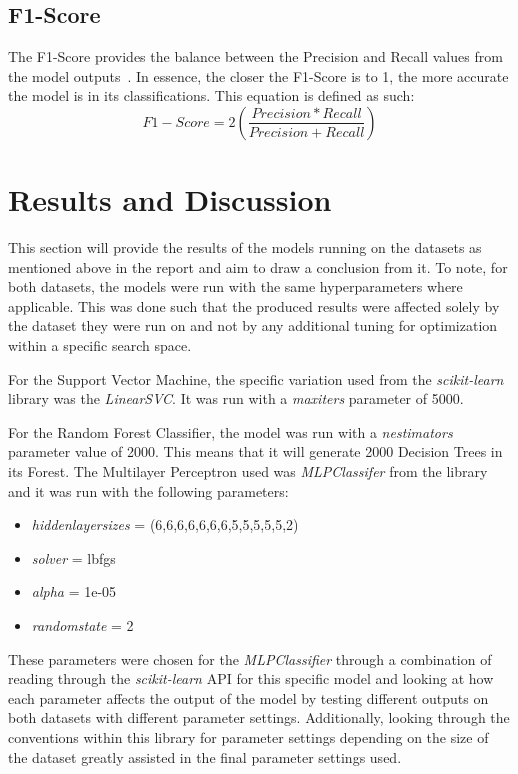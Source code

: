 \documentclass[11pt, a4paper]{article}
\begin{document}
\subsection{F1-Score}
The F1-Score provides the balance between the Precision and Recall values from the model outputs~\cite{f1}. In essence, the closer the F1-Score is to 1, the more accurate the model is in its classifications. This equation is defined as such:\\
\begin{equation}
F1-Score = 2 \left(\frac{Precision * Recall}{Precision + Recall}\right)
\end{equation}

\section{Results and Discussion}

This section will provide the results of the models running on the datasets as mentioned above in the report and aim to draw a conclusion from it. To note, for both datasets, the models were run with the same hyperparameters where applicable. This was done such that the produced results were affected solely by the dataset they were run on and not by any additional tuning for optimization within a specific search space. 

For the Support Vector Machine, the specific variation used from the \emph{scikit-learn} library was the \emph{LinearSVC}. It was run with a \emph{max\textunderscore iters} parameter of 5000. 

For the Random Forest Classifier, the model was run with a \emph{n\textunderscore estimators} parameter value of 2000. This means that it will generate 2000 Decision Trees in its Forest.
\newpage
The Multilayer Perceptron used was \emph{MLPClassifer} from the library and it was run with the following parameters:\\
\begin{itemize}
\item \emph{hidden\textunderscore layer\textunderscore sizes} = (6,6,6,6,6,6,6,5,5,5,5,5,2)
\item \emph{solver} = lbfgs
\item \emph{alpha} = 1e-05
\item \emph{random\textunderscore state} = 2
\end{itemize}

These parameters were chosen for the \emph{MLPClassifier} through a combination of reading through the \emph{scikit-learn} API for this specific model and looking at how each parameter affects the output of the model by testing different outputs on both datasets with different parameter settings. Additionally, looking through the conventions within this library for parameter settings depending on the size of the dataset greatly assisted in the final parameter settings used. 
\end{document}
